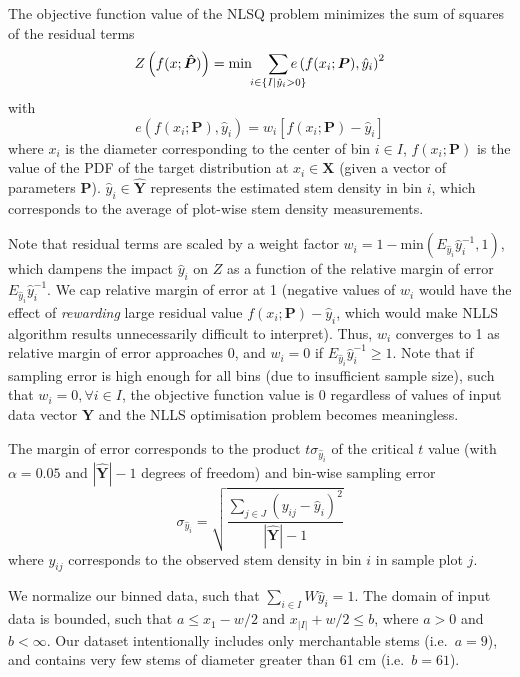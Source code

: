 \message{ !name(pspdistfit_article.tex)}\documentclass{article}
\begin{document}
The objective function value of the NLSQ problem minimizes the sum of squares of the residual terms
\begin{equation}
Z\left(f(x; \bm{\hat{P}})\right) = \text{min} \quad \sum_{\mathclap{i \in \{I|\hat{y}_i > 0\}}} e\left(f(x_i; \bm{P}), \hat{y}_i\right)^2 \label{eq:z}
\end{equation}
with
\begin{equation}
e\left(f(x_i; \bm{P}), \hat{y}_i\right) = w_i \left[f(x_i; \bm{P}) - \hat{y}_i\right] 
\end{equation}
where $x_i$ is the diameter corresponding to the center of bin $i \in I$, $f(x_i; \bm{P})$ is the value of the PDF of the target distribution at $x_i \in \bm{X}$ (given a vector of parameters $\bm{P}$). $\hat{y}_i \in \bm{\hat{Y}}$ represents the estimated stem density in bin $i$, which corresponds to the average of plot-wise stem density measurements.

Note that residual terms are scaled by a weight factor $w_i = 1 - \text{min}(E_{\hat{y}_i}\hat{y}_i^{-1}, 1)$, which dampens the impact $\hat{y}_i$ on $Z$ as a function of the relative margin of error $E_{\hat{y}_i}\hat{y}_i^{-1}$. We cap relative margin of error at 1 (negative values of $w_i$ would have the effect of \emph{rewarding} large residual value $f(x_i; \bm{P}) - \hat{y}_i$, which would make NLLS algorithm results unnecessarily difficult to interpret).  
Thus, $w_i$ converges to 1 as relative margin of error approaches 0, and $w_i = 0$ if $E_{\hat{y}_i}\hat{y}_i^{-1} \geq 1$. 
Note that if sampling error is high enough for all bins (due to insufficient sample size), such that  $w_i = 0, \forall i \in I$, the objective function value is 0 regardless of values of input data vector $\bm{\hat{Y}}$ and the NLLS optimisation problem becomes meaningless.

The margin of error corresponds to the product $t\sigma_{\hat{y}_i}$ of the critical $t$ value (with $\alpha=0.05$ and $|\bm{\hat{Y}}|  - 1$ degrees of freedom) and bin-wise sampling error
\begin{equation}
\sigma_{\hat{y}_i}  = \sqrt{\frac{\sum_{j \in J} \left(y_{ij} - \hat{y}_i\right)^2}{|\bm{\hat{Y}}| - 1}}
\end{equation}
where $y_{ij}$ corresponds to the observed stem density in bin $i$ in sample plot $j$.


We normalize our binned data, such that $\sum_{i \in I} W\hat{y}_i = 1$.
The domain of input data is bounded, such that $a \leq x_1 - w/2$ and $x_{|I|} + w/2 \leq b$, where $a > 0$ and $b < \infty$.
Our dataset intentionally includes only merchantable stems (i.e.~$a =9$), and contains very few stems of diameter greater than 61 cm (i.e.~$b = 61$).
\end{document}
